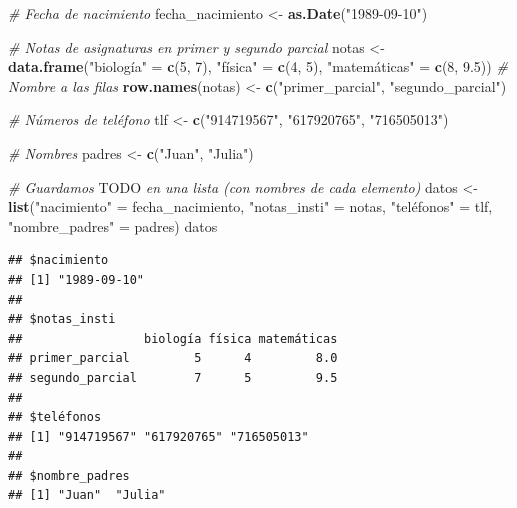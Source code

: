 \documentclass[11pt,]{book}
\newenvironment{Shaded}{\begin{snugshade}}{\end{snugshade}}
\newcommand{\AlertTok}[1]{\textcolor[rgb]{0.33,0.33,0.33}{#1}}
\newcommand{\CommentTok}[1]{\textcolor[rgb]{0.37,0.37,0.37}{\textit{#1}}}
\newcommand{\DecValTok}[1]{\textcolor[rgb]{0.06,0.06,0.06}{#1}}
\newcommand{\FloatTok}[1]{\textcolor[rgb]{0.06,0.06,0.06}{#1}}
\newcommand{\KeywordTok}[1]{\textcolor[rgb]{0.27,0.27,0.27}{\textbf{#1}}}
\newcommand{\NormalTok}[1]{#1}
\newcommand{\StringTok}[1]{\textcolor[rgb]{0.5,0.5,0.5}{#1}}
\begin{document}
\begin{Shaded}
\begin{Highlighting}[]
\CommentTok{# Fecha de nacimiento}
\NormalTok{fecha_nacimiento <-}\StringTok{ }\KeywordTok{as.Date}\NormalTok{(}\StringTok{"1989-09-10"}\NormalTok{)}

\CommentTok{# Notas de asignaturas en primer y segundo parcial}
\NormalTok{notas <-}\StringTok{ }\KeywordTok{data.frame}\NormalTok{(}\StringTok{"biología"}\NormalTok{ =}\StringTok{ }\KeywordTok{c}\NormalTok{(}\DecValTok{5}\NormalTok{, }\DecValTok{7}\NormalTok{), }\StringTok{"física"}\NormalTok{ =}\StringTok{ }\KeywordTok{c}\NormalTok{(}\DecValTok{4}\NormalTok{, }\DecValTok{5}\NormalTok{),}
                    \StringTok{"matemáticas"}\NormalTok{ =}\StringTok{ }\KeywordTok{c}\NormalTok{(}\DecValTok{8}\NormalTok{, }\FloatTok{9.5}\NormalTok{))}
\CommentTok{# Nombre a las filas}
\KeywordTok{row.names}\NormalTok{(notas) <-}\StringTok{ }\KeywordTok{c}\NormalTok{(}\StringTok{"primer_parcial"}\NormalTok{, }\StringTok{"segundo_parcial"}\NormalTok{)}

\CommentTok{# Números de teléfono}
\NormalTok{tlf <-}\StringTok{ }\KeywordTok{c}\NormalTok{(}\StringTok{"914719567"}\NormalTok{, }\StringTok{"617920765"}\NormalTok{, }\StringTok{"716505013"}\NormalTok{)}

\CommentTok{# Nombres}
\NormalTok{padres <-}\StringTok{ }\KeywordTok{c}\NormalTok{(}\StringTok{"Juan"}\NormalTok{, }\StringTok{"Julia"}\NormalTok{)}

\CommentTok{# Guardamos }\AlertTok{TODO}\CommentTok{ en una lista (con nombres de cada elemento)}
\NormalTok{datos <-}\StringTok{ }\KeywordTok{list}\NormalTok{(}\StringTok{"nacimiento"}\NormalTok{ =}\StringTok{ }\NormalTok{fecha_nacimiento,}
              \StringTok{"notas_insti"}\NormalTok{ =}\StringTok{ }\NormalTok{notas, }\StringTok{"teléfonos"}\NormalTok{ =}\StringTok{ }\NormalTok{tlf,}
              \StringTok{"nombre_padres"}\NormalTok{ =}\StringTok{ }\NormalTok{padres)}
\NormalTok{datos}
\end{Highlighting}
\end{Shaded}

\begin{verbatim}
## $nacimiento
## [1] "1989-09-10"
## 
## $notas_insti
##                 biología física matemáticas
## primer_parcial         5      4         8.0
## segundo_parcial        7      5         9.5
## 
## $teléfonos
## [1] "914719567" "617920765" "716505013"
## 
## $nombre_padres
## [1] "Juan"  "Julia"
\end{verbatim}
\end{document}
